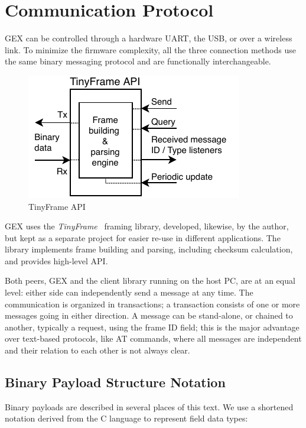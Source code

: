 \chapter{Communication Protocol} \label{sec:tinyframe}

GEX can be controlled through a hardware \gls{UART}, the \gls{USB}, or over a wireless link. To minimize the firmware complexity, all the three connection methods use the same binary messaging protocol and are functionally interchangeable.

\begin{figure}
	\vspace{-1em}
	\centering
	\includegraphics[scale=1]{img/tf-conceptual.pdf}
	\caption{\label{fig:tf-conceptual}TinyFrame API}
\end{figure}

GEX uses the \textit{TinyFrame}~\cite{tinyframerepo} framing library, developed, likewise, by the author, but kept as a separate project for easier re-use in different applications. The library implements frame building and parsing, including checksum calculation, and provides high-level \gls{API}.

Both peers, GEX and the client library running on the host \gls{PC}, are at an equal level: either side can independently send a message at any time. The communication is organized in transactions; a transaction consists of one or more messages going in either direction. A message can be stand-alone, or chained to another, typically a request, using the frame ID field; this is the major advantage over text-based protocols, like AT commands, where all messages are independent and their relation to each other is not always clear.

\section{Binary Payload Structure Notation}

Binary payloads are described in several places of this text. We use a shortened notation derived from the C language to represent field data types:

